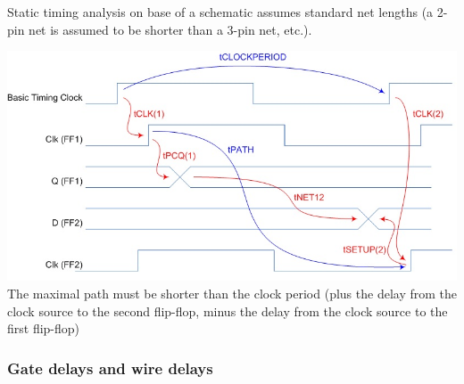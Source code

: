 Static timing analysis on base of a schematic assumes standard net lengths (a 2-pin net is assumed to be shorter than a 3-pin net, etc.).

\begin{multicols}{2}
    \includegraphics[width=0.9\linewidth, height=0.5\linewidth]{images/High_Speed_Digital/clock-to-clock.jpg} \\
    \vfill
    \columnbreak
    The maximal path must be shorter than the clock period (plus the delay from the clock source to the second flip-flop, minus the delay from the clock source to the first flip-flop)
\end{multicols}


\subsubsection{Gate delays and wire delays}
